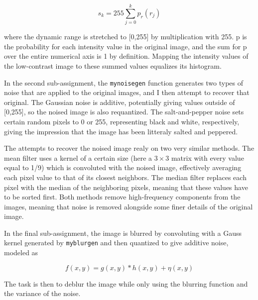 \documentclass[a4paper]{article}
\begin{document}
\begin{equation}
	s_k = 255 \sum_{j=0}^{k} p_r(r_j)
\end{equation}

where the dynamic range is stretched to [0,255] by multiplication with 255. p is the probability for each intensity value in the original image, and the sum for p over the entire numerical axis is 1 by definition. Mapping the intensity values of the low-contrast image to these summed values equalizes its histogram.

In the second sub-assignment, the \texttt{mynoisegen} function generates two types of noise that are applied to the original images, and I then attempt to recover that original. The Gaussian noise is additive, potentially giving values outside of [0,255], so the noised image is also requantized. The salt-and-pepper noise sets certain random pixels to 0 or 255, representing black and white, respectively, giving the impression that the image has been litteraly salted and peppered.

The attempts to recover the noised image realy on two very similar methods. The mean filter uses a kernel of a certain size (here a $3\times3$ matrix with every value equal to 1/9) which is convoluted with the noised image, effectively averaging each pixel value to that of its closest neighbors. The median filter replaces each pixel with the median of the neighboring pixels, meaning that these values have to be sorted first. Both methods remove high-frequency components from the images, meaning that noise is removed alongside some finer details of the original image.

In the final sub-assignment, the image is blurred by convoluting with a Gauss kernel generated by \texttt{myblurgen} and then quantized to give additive noise, modeled as

\begin{equation}
	f(x,y) = g(x,y) * h(x,y) + \eta(x,y)
\end{equation}

The task is then to deblur the image while only using the blurring function and the variance of the noise.


\end{document}
